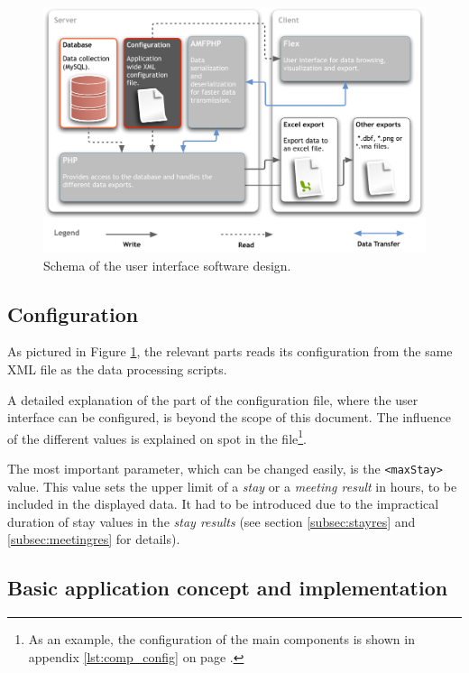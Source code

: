 \begin{figure}[htpb]
\begin{center}
  \includegraphics[width=\textwidth]{assets/pdf/application_design_miceminer.pdf}
  \caption{Schema of the user interface software design.}
  \label{fig:app_design_miceminer}
\end{center}
\end{figure}

\subsection{Configuration}
\label{subsec:miceminer_config}

As pictured in Figure \ref{fig:app_design_miceminer}, the relevant parts reads its configuration from the same XML file as the data processing scripts. 

A detailed explanation of the  part of the configuration file, where the user interface can be configured, is beyond the scope of this document. The influence of the different values is explained on spot in the file\footnote{ As an example, the configuration of the main components is shown in appendix \ref{lst:comp_config} on page \pageref{lst:comp_config}.}.

The most important parameter, which can be changed easily, is the \lstinline|<maxStay>| value. This value sets the upper limit of a \textit{stay} or a \textit{meeting result} in hours, to be included in the displayed data. It had to be introduced due to the impractical duration of stay values in the \textit{stay results} (see section \ref{subsec:stayres} and \ref{subsec:meetingres} for details).

\subsection{Basic application concept and implementation}
\label{subsec:app_concept}

